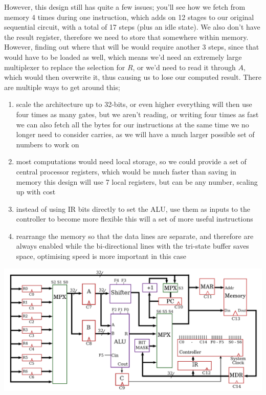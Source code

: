 \documentclass[a4paper, 12pt]{article}
\begin{document}
            However, this design still has quite a few issues; you'll see how we fetch from memory 4 times during one instruction, which adds on 12 stages to our original sequential circuit, with a total of 17 steps (plus an idle state). We also don't have the result register, therefore we need to store that somewhere within memory. However, finding out where that will be would require another 3 steps, since that would have to be loaded as well, which means we'd need an extremely large multiplexer to replace the selection for $R$, or we'd need to read it through $A$, which would then overwrite it, thus causing us to lose our computed result. There are multiple ways to get around this;
            \begin{enumerate}[1.]
                \itemsep0em
                \item scale the architecture up to 32-bits, or even higher
                    \subitem everything will then use four times as many gates, but we aren't reading, or writing four times as fast
                    \subitem we can also fetch all the bytes for our instructions at the same time
                    \subitem we no longer need to consider carries, as we will have a much larger possible set of numbers to work on
                \item most computations would need local storage, so we could provide a set of central processor registers, which would be much faster than saving in memory
                    \subitem this design will use 7 local registers, but can be any number, scaling up with cost
                \item instead of using IR bits directly to set the ALU, use them as inputs to the controller to become more flexible
                    \subitem this will a set of more useful instructions
                \item rearrange the memory so that the data lines are separate, and therefore are always enabled
                    \subitem while the bi-directional lines with the tri-state buffer saves space, optimising speed is more important in this case
            \end{enumerate}

            \includegraphics[width=\linewidth]{2019-04-11-18-21-11.png}
\end{document}
